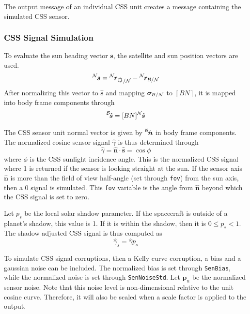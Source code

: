 The output message of an individual CSS unit creates a message containing the simulated CSS sensor.


\subsubsection{CSS Signal Simulation}
To evaluate the sun heading vector $\bm s$, the satellite and sun position vectors are used.
\begin{equation}
	\leftexp{N}{\bm s} = \leftexp{N}{\bm r}_{\sun/\mathcal{N}} - \leftexp{N}{\bm r}_{\cal B/N}
\end{equation}
After normalizing this vector to $\hat{\bm s}$ and mapping $\bm\sigma_{\cal B/N}$ to $[BN]$, it is mapped into body frame components through
\begin{equation}
	\leftexp{B}{\hat{\bm s}} = [BN] \leftexp{N}{\hat{\bm s}}
\end{equation}

The CSS sensor unit normal vector is given by $\leftexp{B}{\hat{\bm n}}$ in body frame components.  The normalized cosine sensor signal $\hat\gamma$ is thus determined through
\begin{equation}
	\hat \gamma = \hat{\bm n} \cdot \hat{\bm s} = \cos\phi
\end{equation}
where $\phi$ is the CSS sunlight incidence angle.  
This is the normalized CSS signal where 1 is returned if the sensor is looking straight at the sun.  If the sensor axis $\hat{\bm n}$ is more than the field of view half-angle (set through {\tt fov}) from the sun axis, then a 0 signal is simulated.  This {\tt fov} variable is the angle from $\hat{\bm n}$ beyond which the CSS signal is set to zero.  

Let $p_{s}$ be the local solar shadow parameter.  If the spacecraft is outside of a planet's shadow, this value is 1.  If it is within the shadow, then it is $0\le p_{s} < 1$.  The shadow adjusted CSS signal is thus computed as 
\begin{equation}
	\hat{\gamma}_{s} = \hat{\gamma} p_{s}
\end{equation}


To simulate CSS signal corruptions, then a Kelly curve corruption, a bias and a gaussian noise can be included.  The normalized bias is set through {\tt SenBias}, while the normalized noise is set through {\tt SenNoiseStd}.   Let $\bm p_{n}$ be the normalized sensor noise.  Note that this noise level is non-dimensional relative to the unit cosine curve.  Therefore, it will also be scaled when a scale factor is applied to the output.

